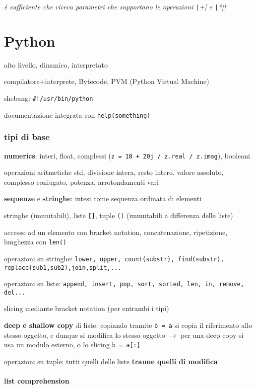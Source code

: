 \emph{\`e sufficiente che riceva parametri che supportano le operazioni \texttt|+| e \texttt|*|!}

\part{Python}

alto livello, dinamico, interpretato

compilatore+interprete, Bytecode, PVM (Python Virtual Machine)

  shebang: \texttt{#!/usr/bin/python}

documentazione integrata con \texttt{help(something)}

\section{tipi di base}

\textbf{numerics}: interi, float, complessi (\texttt{z = 10 + 20j / z.real / z.imag}), booleani

operazioni aritmetiche std, divisione intera, resto intero, valore assoluto, complesso coniugato, potenza, arrotondamenti vari

\textbf{sequenze} e \textbf{stringhe}: intesi come sequenza ordinata di elementi

stringhe (immutabili), liste \texttt{[]}, tuple \texttt{()} (immutabili a differenza delle liste)

accesso ad un elemento con bracket notation, concatenazione, ripetizione, lunghezza con \texttt{len()}

operazioni su stringhe: \texttt{lower, upper, count(substr), find(substr), replace(sub1,sub2),join,split,...}

operazioni su liste: \texttt{append, insert, pop, sort, sorted, len, in, remove, del...}

slicing mediante bracket notation (per entrambi i tipi)

\textbf{deep e shallow copy} di liste: copiando tramite \texttt{b = a} si copia il riferimento allo stesso oggetto, e dunque si modifica lo stesso oggetto $\rightarrow$ per una deep copy si usa un modulo esterno, o lo slicing \texttt{b = a[:]} 

operazioni su tuple: tutti quelli delle liste \textbf{tranne quelli di modifica}

\subsection{list comprehension}

